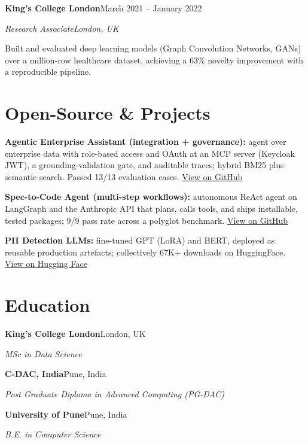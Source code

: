\documentclass[10pt,a4paper]{article}
\newcommand{\entry}[4]{%
  {\color{company}\bfseries #1}\hfill {\color{muted}#2}\par
  \vspace{1pt}
  {\itshape #3}\hfill {\color{muted}\itshape #4}\par
  \vspace{3pt}%
}
\begin{document}
\entry{King's College London}{March 2021 -- January 2022}{Research Associate}{London, UK}
\begin{tight}
  \item Built and evaluated deep learning models (Graph Convolution Networks, GANs) over a million-row healthcare dataset, achieving a 63\% novelty improvement with a reproducible pipeline.
\end{tight}

\section{Open-Source \& Projects}
\begin{tight}
  \item \textbf{Agentic Enterprise Assistant (integration + governance):} agent over enterprise data with role-based access and OAuth at an MCP server (Keycloak JWT), a grounding-validation gate, and auditable traces; hybrid BM25 plus semantic search. Passed 13/13 evaluation cases. \href{https://github.com/abhijeetscode/Agentic-Enterprise-Assistant}{View on GitHub}
  \item \textbf{Spec-to-Code Agent (multi-step workflows):} autonomous ReAct agent on LangGraph and the Anthropic API that plans, calls tools, and ships installable, tested packages; 9/9 pass rate across a polyglot benchmark. \href{https://github.com/abhijeetscode/Spec-to-Code-Agent}{View on GitHub}
  \item \textbf{PII Detection LLMs:} fine-tuned GPT (LoRA) and BERT, deployed as reusable production artefacts; collectively 67K+ downloads on HuggingFace. \href{https://huggingface.co/ab-ai/pii_model}{View on Hugging Face}
\end{tight}

\section{Education}
{\color{company}\bfseries King's College London}\hfill {\color{muted}London, UK}\par
{\itshape MSc in Data Science}\par\vspace{2pt}
{\color{company}\bfseries C-DAC, India}\hfill {\color{muted}Pune, India}\par
{\itshape Post Graduate Diploma in Advanced Computing (PG-DAC)}\par\vspace{2pt}
{\color{company}\bfseries University of Pune}\hfill {\color{muted}Pune, India}\par
{\itshape B.E. in Computer Science}\par
\end{document}
